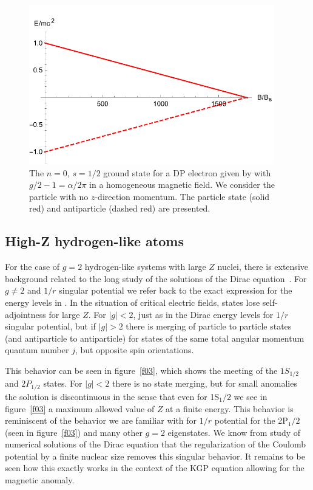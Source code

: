 \begin{figure}[h]
     \centering
     \includegraphics[clip, trim=0.0cm 0.0cm 0.0cm 0.5cm,width=0.95\textwidth]{plots/chap02moment/lanplot02.pdf}
     \caption{The $n=0$, $s=1/2$ ground state for a DP electron given by  with $g/2-1=\alpha/2\pi$ in a homogeneous magnetic field. We consider the particle with no $z$-direction momentum. The particle state (solid red) and antiparticle (dashed red) are presented.}
     \label{f02}
\end{figure}

\subsection{High-Z hydrogen-like atoms}
\label{sec:sbc}
\noindent For the case of $g\!=\!2$ hydrogen-like systems with large $Z$ nuclei, there is extensive background related to the long study of the solutions of the Dirac equation~\citep{Rafelski:1976ts,Greiner:1985ce,Rafelski:2016ixr}. For $g\ne 2$ and $1/r$ singular potential we refer back to the exact expression for the energy levels in . In the situation of critical electric fields, states lose self-adjointness for large $Z$. For $|g|<2$, just as in the Dirac energy levels for $1/r$ singular potential, but if $|g|>2$ there is merging of particle to particle states (and antiparticle to antiparticle) for states of the same total angular momentum quantum number $j$, but opposite spin orientations.

This behavior can be seen in figure~\ref{f03}, which shows the meeting of the $1S_{1/2}$ and $2P_{1/2}$ states. For $|g|<2$ there is no state merging, but for small anomalies the solution is discontinuous in the sense that even for 1S$_1/2$ we see in figure~\ref{f03} a maximum allowed value of $Z$ at a finite energy. This behavior is reminiscent of the behavior we are familiar with for $1/r$ potential for the 2P$_1/2$ (seen in figure~\ref{f03}) and many other $g\!=\!2$ eigenstates. We know from study of numerical solutions of the Dirac equation that the regularization of the Coulomb potential by a finite nuclear size removes this singular behavior. It remains to be seen how this exactly works in the context of the KGP equation allowing for the magnetic anomaly.

